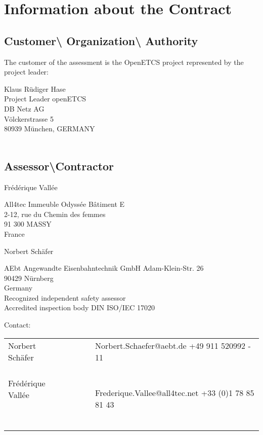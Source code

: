 \clearpage\section{Information about the Contract}
\subsection{Customer{\textbackslash}
Organization{\textbackslash} Authority}
The customer of the assessment is the OpenETCS project represented by the project leader:

Klaus R\"udiger Hase\\
Project Leader openETCS \\
DB Netz AG\\
Völckerstrasse 5\\
80939 München, GERMANY\\
\\


\bigskip

\subsection{Assessor{\textbackslash}Contractor}
Fr\'ed\'erique Vall\'ee

All4tec\newline
  Immeuble Odyss\'ee B\^{a}timent E \\
  2-12, rue du Chemin des femmes\\
  91 300 MASSY\\
  France\\


\bigskip

Norbert Sch\"afer

AEbt Angewandte Eisenbahntechnik GmbH\newline
  Adam-Klein-Str. 26\\
  90429 N\"urnberg\\
  Germany\\

Recognized independent safety assessor\\
Accredited inspection body DIN ISO/IEC 17020



\bigskip


\bigskip

Contact:

\begin{flushleft}
\tablefirsthead{}
\tablehead{}
\tabletail{}
\tablelasttail{}
\begin{supertabular}{m{4.0020003cm}m{2.3539999cm}m{2.3539999cm}m{7.491cm}}
Norbert Sch\"afer &
~
 &
~
 &
Norbert.Schaefer@aebt.de\newline
+49 911 520992 - 11\\
\\
Fr\'ed\'erique Vall\'ee

~
 &
~
 &
~
 &
Frederique.Vallee@all4tec.net\newline
+33 (0)1 78 85 81 43\\
\end{supertabular}
\end{flushleft}

